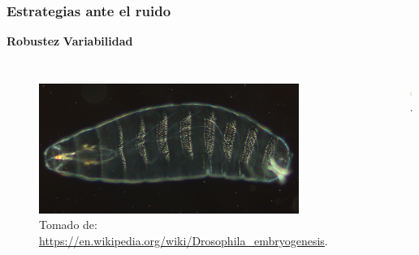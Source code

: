 \documentclass{beamer}
\begin{document}
\begin{frame}
\frametitle{Estrategias ante el ruido}
\hspace{20 mm} \textbf{Robustez} \hspace{40 mm} \textbf{Variabilidad}
\begin{columns}[c]
\begin{figure}[p]
    \centering
    \includegraphics[width=0.9\textwidth]{drosophila.jpg}\\
    \tiny Tomado de: \url{https://en.wikipedia.org/wiki/Drosophila_embryogenesis}.
\end{figure}

\begin{figure}[p]
    \centering
    \includegraphics[width=0.7\textwidth]{lambda.jpg}\\
    \tiny \cite{cooper00}.
\end{figure}
\end{columns}
\end{frame}
\end{document}
